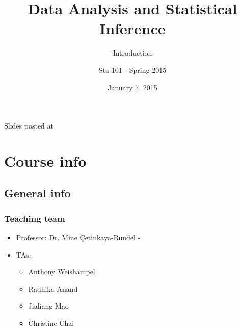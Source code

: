 \documentclass[11pt,containsverbatim,handout,xcolor=xelatex,dvipsnames,table]{beamer}
\title{Data Analysis and Statistical Inference}
\subtitle{Introduction}
\author{Sta 101 - Spring 2015}
\date{January 7, 2015}
\institute{Duke University, Department of Statistical Science}
\begin{document}



\begin{frame}[plain]

\titlepage
\vfill
{\scriptsize {} \hfill Slides posted at  }
\addtocounter{framenumber}{-1} 

\end{frame}


\section{Course info}



\subsection{General info}


\begin{frame}
\frametitle{Teaching team}

\begin{itemize}

\item Professor: Dr. Mine \c{C}etinkaya-Rundel - 

\item TAs:
\begin{itemize}
\item Anthony Weishampel
\item Radhika Anand
\item Jialiang Mao
\item Christine Chai
\end{itemize}

\end{itemize}

\end{frame}

\end{document}
